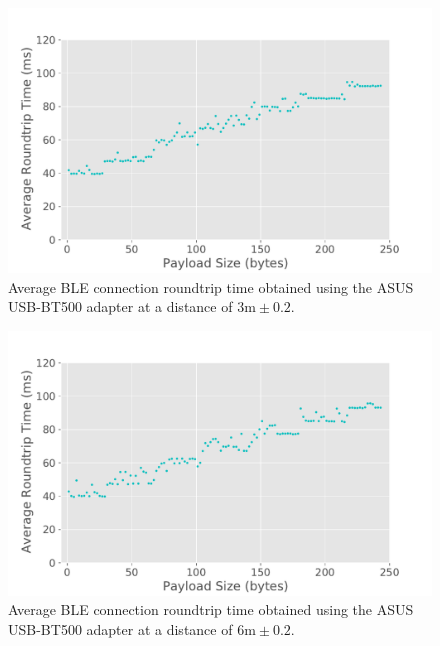 \begin{figure}[H]
    \centering
    \includegraphics[width=0.75\linewidth]{images/ble-roundtrip-hci0-300cm.pdf}
    \caption[Average \acs{BLE} connection roundtrip time obtained using the ASUS USB-BT500 adapter at a distance of 3m.]{Average \acs{BLE} connection roundtrip time obtained using the ASUS USB-BT500 adapter at a distance of $3\text{m} \pm 0.2$.}
    \label{fig:ble-roundtrip-hci0-3m}
\end{figure}

\begin{figure}[H]
    \centering
    \includegraphics[width=0.75\linewidth]{images/ble-roundtrip-hci0-600cm.pdf}
    \caption[Average \acs{BLE} connection roundtrip time obtained using the ASUS USB-BT500 adapter at a distance of 6m.]{Average \acs{BLE} connection roundtrip time obtained using the ASUS USB-BT500 adapter at a distance of $6\text{m} \pm 0.2$.}
    \label{fig:ble-roundtrip-hci0-6m}
\end{figure}


